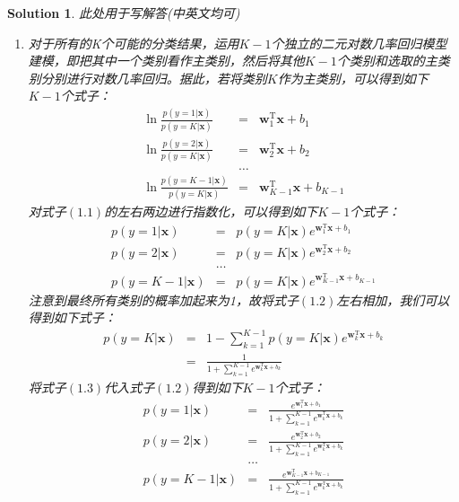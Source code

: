 \documentclass[a4paper,UTF8]{article}
\numberwithin{equation}{section}
\newtheorem*{solution}{Solution}
\begin{document}
\begin{solution}
此处用于写解答(中英文均可)
\begin{enumerate}
	\item 对于所有的K个可能的分类结果，运用$K-1$个独立的二元对数几率回归模型建模，即把其中一个类别看作主类别，然后将其他$K-1$个类别和选取的主类别分别进行对数几率回归。据此，若将类别$K$作为主类别，可以得到如下$K-1$个式子：
		\begin{eqnarray}
			\ln\frac{p(y=1|\mathbf{x})}{p(y=K|\mathbf{x})}&=&\mathbf{w}_1^\mathrm{T}\mathbf{x}+b_1\\
			\ln\frac{p(y=2|\mathbf{x})}{p(y=K|\mathbf{x})}&=&\mathbf{w}_2^\mathrm{T}\mathbf{x}+b_2 \nonumber\\
			&\dots& \nonumber\\
			\ln\frac{p(y={K-1}|\mathbf{x})}{p(y=K|\mathbf{x})}&=&\mathbf{w}_{K-1}^\mathrm{T}\mathbf{x}+b_{K-1} \nonumber
		\end{eqnarray}
		对式子$(1.1)$的左右两边进行指数化，可以得到如下$K-1$个式子：
		\begin{eqnarray}
			p(y=1|\mathbf{x})&=&p(y=K|\mathbf{x})e^{\mathbf{w}_1^\mathrm{T}\mathbf{x}+b_1}\\
			p(y=2|\mathbf{x})&=&p(y=K|\mathbf{x})e^{\mathbf{w}_2^\mathrm{T}\mathbf{x}+b_2} \nonumber\\
			&\dots& \nonumber\\
			p(y={K-1}|\mathbf{x})&=&p(y=K|\mathbf{x})e^{\mathbf{w}_{K-1}^\mathrm{T}\mathbf{x}+b_{K-1}} \nonumber
		\end{eqnarray}
		注意到最终所有类别的概率加起来为1，故将式子$(1.2)$左右相加，我们可以得到如下式子：
		\begin{eqnarray}
			p(y=K|\mathbf{x})&=&1-\sum_{k=1}^{K-1}p(y=K|\mathbf{x})e^{\mathbf{w}_k^\mathrm{T}\mathbf{x}+b_k}\\
			&=&\frac{1}{1+\sum_{k=1}^{K-1} e^{\mathbf{w}_k^\mathrm{T}\mathbf{x}+b_k}}\nonumber
		\end{eqnarray}
		将式子$(1.3)$代入式子$(1.2)$得到如下$K-1$个式子：
		\begin{eqnarray}
			p(y=1|\mathbf{x})&=&\frac{e^{\mathbf{w}_1^\mathrm{T}\mathbf{x}+b_1}}{1+\sum_{k=1}^{K-1} e^{\mathbf{w}_k^\mathrm{T}\mathbf{x}+b_k}}\\
			p(y=2|\mathbf{x})&=&\frac{e^{\mathbf{w}_2^\mathrm{T}\mathbf{x}+b_2}}{1+\sum_{k=1}^{K-1} e^{\mathbf{w}_k^\mathrm{T}\mathbf{x}+b_k}} \nonumber\\
			&\dots& \nonumber\\
			p(y={K-1}|\mathbf{x})&=&\frac{e^{\mathbf{w}_{K-1}^\mathrm{T}\mathbf{x}+b_{K-1}}}{1+\sum_{k=1}^{K-1} e^{\mathbf{w}_k^\mathrm{T}\mathbf{x}+b_k}} \nonumber

\end{eqnarray}
\end{enumerate}
\end{solution}
\end{document}

